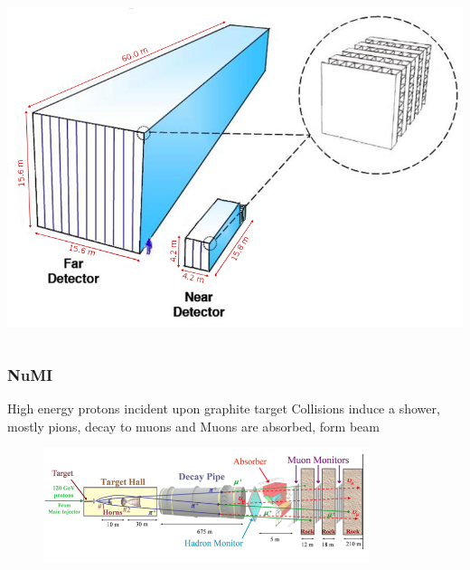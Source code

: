 \documentclass[10pt,professionalfonts,xcolor=table]{beamer}
\begin{document}
{\begin{columns}[c]
\vspace{7pt}

\includegraphics[width=1\textwidth]{figures/figures/detectors.png}

\end{columns}


}

\frame
{
  \frametitle{NuMI}
    \begin{itemize}
	\bang High energy protons incident upon graphite target
  \gap
	\bang Collisions induce a shower, mostly pions, decay to muons and \numu
  \gap
	\bang Muons are absorbed, \numu form beam
\end{itemize}
\gap
\begin{figure} \includegraphics[width=0.85\textwidth]{figures/figures/numi.png} \end{figure}
}
\end{document}
